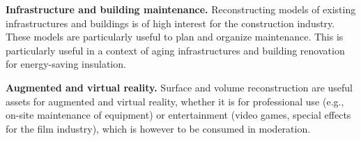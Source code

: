 \documentclass[10pt,twocolumn,letterpaper]{article}
\begin{document}
\textbf{Infrastructure and building maintenance.}
Reconstructing models of existing infrastructures and buildings is of high interest for the construction industry. These models are particularly useful to plan and organize maintenance. This is particularly useful in a context of aging infrastructures and building renovation for energy-saving insulation.

\textbf{Augmented and virtual reality.}
Surface and volume reconstruction are useful assets for augmented and virtual reality, whether it is for professional use (e.g., on-site maintenance of equipment) or entertainment (video games, special effects for the film industry), which is however to be consumed in moderation.

 
\end{document}
